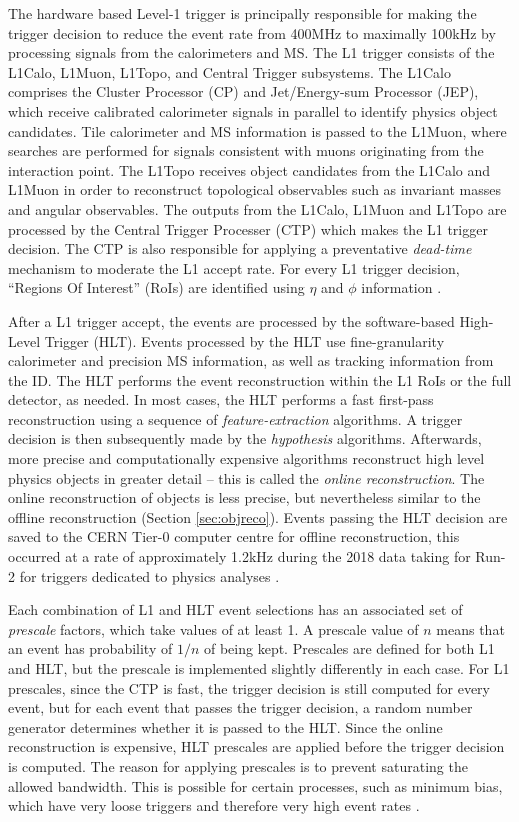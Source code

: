 The hardware based Level-1 trigger is principally responsible for making the trigger decision to reduce the event rate from 400MHz to maximally 100kHz by processing signals from the calorimeters and MS. The L1 trigger consists of the L1Calo, L1Muon, L1Topo, and Central Trigger subsystems. The L1Calo comprises the Cluster Processor (CP) and Jet/Energy-sum Processor (JEP), which receive calibrated calorimeter signals in parallel to identify physics object candidates. Tile calorimeter and MS information is passed to the L1Muon, where searches are performed for signals consistent with muons originating from the interaction point. The L1Topo receives object candidates from the L1Calo and L1Muon in order to reconstruct topological observables such as invariant masses and angular observables. The outputs from the L1Calo, L1Muon and L1Topo are processed by the Central Trigger Processer (CTP) which makes the L1 trigger decision. The CTP is also responsible for applying a preventative \textit{dead-time} mechanism to moderate the L1 accept rate. For every L1 trigger decision, ``Regions Of Interest'' (RoIs) are identified using $\eta$ and $\phi$ information \cite{Buckley:PCP,Atlas:tdaq,Atlas:willL1Trigger}. 

After a L1 trigger accept, the events are processed by the software-based High-Level Trigger (HLT). Events processed by the HLT use fine-granularity calorimeter and precision MS information, as well as tracking information from the ID. The HLT performs the event reconstruction within the L1 RoIs or the full detector, as needed. In most cases, the HLT performs a fast first-pass reconstruction using a sequence of \textit{feature-extraction} algorithms. A trigger decision is then subsequently made by the \textit{hypothesis} algorithms. Afterwards, more precise and computationally expensive algorithms reconstruct high level physics objects in greater detail -- this is called the \textit{online reconstruction}. The online reconstruction of objects is less precise, but nevertheless similar to the offline reconstruction (Section \ref{sec:objreco}). Events passing the HLT decision are saved to the CERN Tier-0 computer centre for offline reconstruction, this occurred at a rate of approximately 1.2kHz during the 2018 data taking for Run-2 for triggers dedicated to physics analyses \cite{Atlas:tdaq,Atlas:trig2015}. 

Each combination of L1 and HLT event selections has an associated set of \textit{prescale} factors, which take values of at least 1. A prescale value of $n$ means that an event has probability of $1/n$ of being kept. Prescales are defined for both L1 and HLT, but the prescale is implemented slightly differently in each case. For L1 prescales, since the CTP is fast, the trigger decision is still computed for every event, but for each event that passes the trigger decision, a random number generator determines whether it is passed to the HLT. Since the online reconstruction is expensive, HLT prescales are applied before the trigger decision is computed. The reason for applying prescales is to prevent saturating the allowed bandwidth. This is possible for certain processes, such as minimum bias, which have very loose triggers and therefore very high event rates \cite{Buckley:PCP}.

